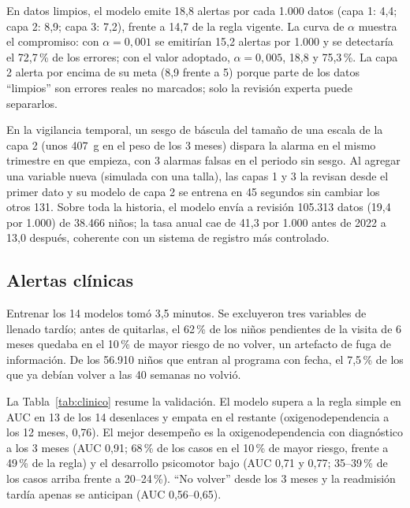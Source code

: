 

En datos limpios, el modelo emite 18,8 alertas por cada 1.000 datos (capa 1: 4,4; capa 2: 8,9; capa 3: 7,2), frente a 14,7 de la regla vigente. La curva de $\alpha$ muestra el compromiso: con $\alpha = 0{,}001$ se emitirían 15,2 alertas por 1.000 y se detectaría el 72,7\,\% de los errores; con el valor adoptado, $\alpha = 0{,}005$, 18,8 y 75,3\,\%. La capa 2 alerta por encima de su meta (8,9 frente a 5) porque parte de los datos ``limpios'' son errores reales no marcados; solo la revisión experta puede separarlos.

En la vigilancia temporal, un sesgo de báscula del tamaño de una escala de la capa 2 (unos 407~g en el peso de los 3 meses) dispara la alarma en el mismo trimestre en que empieza, con 3 alarmas falsas en el periodo sin sesgo. Al agregar una variable nueva (simulada con una talla), las capas 1 y 3 la revisan desde el primer dato y su modelo de capa 2 se entrena en 45 segundos sin cambiar los otros 131. Sobre toda la historia, el modelo envía a revisión 105.313 datos (19,4 por 1.000) de 38.466 niños; la tasa anual cae de 41,3 por 1.000 antes de 2022 a 13,0 después, coherente con un sistema de registro más controlado.

\subsection{Alertas clínicas}
\label{sec:res-clinico}
Entrenar los 14 modelos tomó 3,5 minutos. Se excluyeron tres variables de llenado tardío; antes de quitarlas, el 62\,\% de los niños pendientes de la visita de 6 meses quedaba en el 10\,\% de mayor riesgo de no volver, un artefacto de fuga de información. De los 56.910 niños que entran al programa con fecha, el 7,5\,\% de los que ya debían volver a las 40 semanas no volvió.

La Tabla~\ref{tab:clinico} resume la validación. El modelo supera a la regla simple en AUC en 13 de los 14 desenlaces y empata en el restante (oxigenodependencia a los 12 meses, 0,76). El mejor desempeño es la oxigenodependencia con diagnóstico a los 3 meses (AUC 0,91; 68\,\% de los casos en el 10\,\% de mayor riesgo, frente a 49\,\% de la regla) y el desarrollo psicomotor bajo (AUC 0,71 y 0,77; 35--39\,\% de los casos arriba frente a 20--24\,\%). ``No volver'' desde los 3 meses y la readmisión tardía apenas se anticipan (AUC 0,56--0,65).

